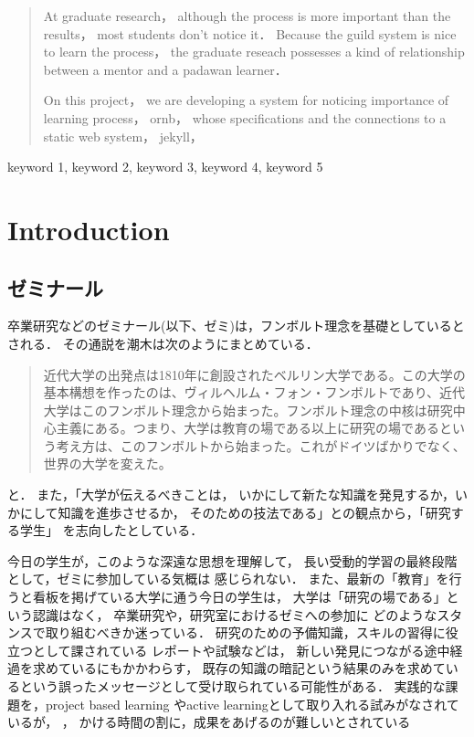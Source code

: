 \documentclass{hissymp}
\author{bob}
\date{}
\begin{document}
\begin{abstract}
\label{sec:org05ffce1}
At graduate research，
although the process is more important than the results，
most students don't notice it．
Because the guild system is nice to learn the process，
the graduate reseach possesses a kind of
relationship between
a mentor and a padawan learner．

On this project，
we are developing a system for
noticing importance of learning process，
ornb， whose specifications and
the connections to a static web system， jekyll，


\end{abstract}

\begin{keyword}
keyword 1, keyword 2, keyword 3, keyword 4, keyword 5
\end{keyword}

\maketitle
\section{Introduction}

\label{sec:org3cbd641}
\subsection{ゼミナール}
\label{sec:org24d857a}
卒業研究などのゼミナール(以下、ゼミ)は，フンボルト理念を基礎としているとされる．
その通説を潮木は次のようにまとめている．
\begin{quote}
近代大学の出発点は1810年に創設されたベルリン大学である。この大学の基本構想を作ったのは、ヴィルヘルム・フォン・フンボルトであり、近代大学はこのフンボルト理念から始まった。フンボルト理念の中核は研究中心主義にある。つまり、大学は教育の場である以上に研究の場であるという考え方は、このフンボルトから始まった。これがドイツばかりでなく、世界の大学を変えた。
\cite{Ushiogi_column}
\end{quote}
と． また，「大学が伝えるべきことは，
いかにして新たな知識を発見するか，いかにして知識を進歩させるか，
そのための技法である」との観点から，「研究する学生」
を志向したとしている\cite{Ushiogi}．

今日の学生が，このような深遠な思想を理解して，
長い受動的学習の最終段階として，ゼミに参加している気概は
感じられない．
また、最新の「教育」を行うと看板を掲げている大学に通う今日の学生は，
大学は「研究の場である」という認識はなく，
卒業研究や，研究室におけるゼミへの参加に
どのようなスタンスで取り組むべきか迷っている．
研究のための予備知識，スキルの習得に役立つとして課されている
レポートや試験などは，
新しい発見につながる途中経過を求めているにもかかわらす，
既存の知識の暗記という結果のみを求めているという誤ったメッセージとして受け取られている可能性がある．
実践的な課題を，project based learning \cite{Bell}
やactive learningとして取り入れる試みがなされているが，
\cite{Settles}，\cite{溝上}
かける時間の割に，成果をあげるのが難しいとされている
\end{document}
